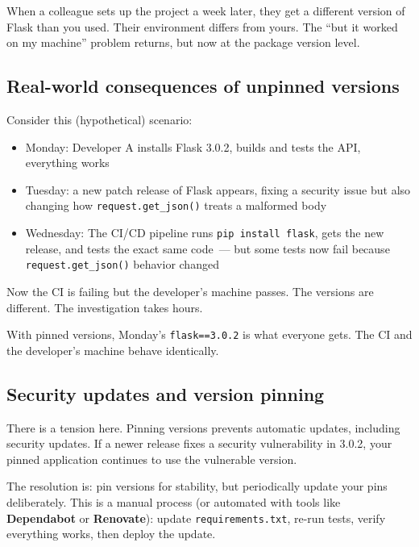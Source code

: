 \noindent{}When a colleague sets up the project a week later, they get a different version of Flask than you used. Their environment differs from yours. The ``but it worked on my machine'' problem returns, but now at the package version level.

\subsection*{Real-world consequences of unpinned versions}\label{12-dependency-declaration:real-world-consequences-of-unpinned-versions}

Consider this (hypothetical) scenario:

\begin{itemize}
\tightlist
\item
  Monday: Developer A installs Flask 3.0.2, builds and tests the API, everything works
\item
  Tuesday: a new patch release of Flask appears, fixing a security issue but also changing how \texttt{request.get\_json()} treats a malformed body
\item
  Wednesday: The CI/CD pipeline runs \texttt{pip\ install\ flask}, gets the new release, and tests the exact same code~--- but some tests now fail because \texttt{request.get\_json()} behavior changed
\end{itemize}

\noindent{}Now the CI is failing but the developer's machine passes. The versions are different. The investigation takes hours.

With pinned versions, Monday's \texttt{flask==3.0.2} is what everyone gets. The CI and the developer's machine behave identically.

\subsection*{Security updates and version pinning}\label{12-dependency-declaration:security-updates-and-version-pinning}

There is a tension here. Pinning versions prevents automatic updates, including security updates. If a newer release fixes a security vulnerability in 3.0.2, your pinned application continues to use the vulnerable version.

The resolution is: pin versions for stability, but periodically update your pins deliberately. This is a manual process (or automated with tools like \textbf{Dependabot} or \textbf{Renovate}): update \texttt{requirements.txt}, re-run tests, verify everything works, then deploy the update.

